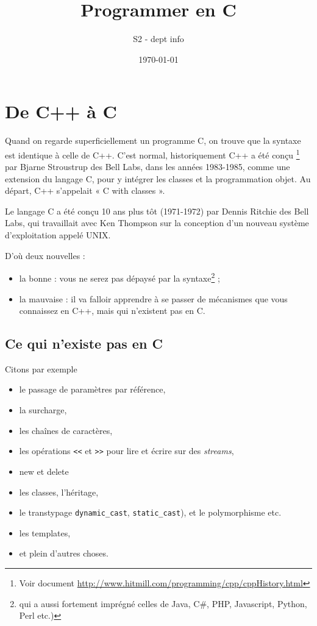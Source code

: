 \documentclass[10pt]{article}
\title{Programmer en C}
\author{S2 - dept info}
\date{\today}
\begin{document}
\maketitle

\tableofcontents

\section{De C++ à C}

Quand on regarde superficiellement un programme C, on trouve
que la syntaxe est identique à celle de C++. 
C'est normal, historiquement C++ a été conçu
\footnote{Voir document
\url{http://www.hitmill.com/programming/cpp/cppHistory.html}} 
par Bjarne Stroustrup  des Bell Labs, dans les années
1983-1985, comme une extension
du langage C, pour y intégrer les classes et la programmation objet.
Au départ, C++ s'appelait « C with classes ».


Le langage C a été conçu 10 ans plus tôt (1971-1972) par 
Dennis Ritchie des Bell Labs, qui travaillait avec Ken Thompson 
sur la conception d'un nouveau système d'exploitation appelé UNIX.


D'où deux nouvelles : 
\begin{itemize}
\item la bonne : vous ne serez pas dépaysé par la 
syntaxe\footnote{qui a aussi fortement imprégné celles de Java,  C\#, 
PHP, Javascript, Python, Perl etc.)} ;
\item la mauvaise :  il va falloir  apprendre à se passer 
de mécanismes que vous connaissez en C++, mais qui n'existent pas
en C. 
\end{itemize}

\subsection{Ce qui n'existe pas en C}

Citons par exemple 
\begin{itemize}
\item le passage de paramètres par référence,
\item la surcharge,
\item les chaînes de caractères,
\item les opérations \texttt{<<} et \texttt{>>} pour lire et écrire sur
des \emph{streams},
\item new et delete
\item les classes, l'héritage, 
\item  le transtypage \texttt{dynamic\_cast}, \texttt{static\_cast}),
et le polymorphisme etc.
\item les templates,
\item et plein d'autres choses.
\end{itemize}
\end{document}
